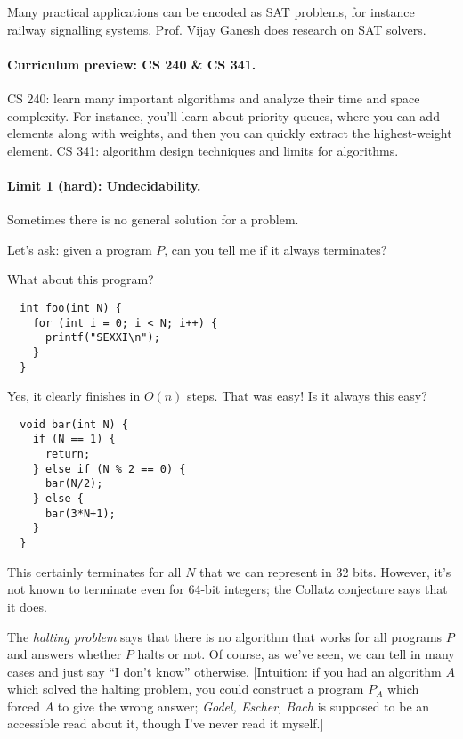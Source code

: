 \documentclass[11pt]{article}
\begin{document}
Many practical applications can be encoded as SAT problems, for
instance railway signalling systems. Prof. Vijay Ganesh does research
on SAT solvers.

\paragraph{Curriculum preview: CS 240 \& CS 341.}
CS 240: learn many important algorithms
and analyze their time and space complexity. For 
instance, you'll learn about priority queues, where
you can add elements along with weights, and
then you can quickly extract the highest-weight element.
CS 341: algorithm design techniques and limits for algorithms.

\paragraph{Limit 1 (hard): Undecidability.} Sometimes there 
is no general solution for a problem.

Let's ask: given a program $P$, can you tell me if it always 
terminates?

What about this program?

\begin{lstlisting}
  int foo(int N) {
    for (int i = 0; i < N; i++) {
      printf("SEXXI\n");
    }
  }
\end{lstlisting}

Yes, it clearly finishes in $O(n)$ steps. That was easy! Is it always this easy?

\begin{lstlisting}
  void bar(int N) {
    if (N == 1) {
      return;
    } else if (N % 2 == 0) {
      bar(N/2);
    } else {
      bar(3*N+1);
    }
  }
\end{lstlisting}

This certainly terminates for all $N$ that we can represent in 32 bits. However, it's not
known to terminate even for 64-bit integers; the Collatz conjecture says that it does.

The \emph{halting problem} says that there is no algorithm that works for all programs $P$
and answers whether $P$ halts or not. Of course, as we've seen, we can tell in many cases
and just say ``I don't know'' otherwise. [Intuition: if you had an algorithm $A$ which solved
the halting problem, you could construct a program $P_A$ which forced $A$ to give the wrong answer;
\emph{Godel, Escher, Bach} is supposed to be an accessible read about it, though I've never read it
myself.]
\end{document}
